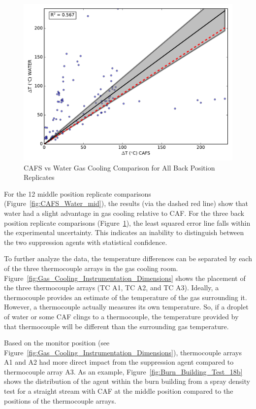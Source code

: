 \documentclass[12pt,oneside]{book}
\begin{document}
\begin{figure}[!ht]
	\includegraphics[width=.7\columnwidth]{../Figures/Gas_Cooling/Combined_fullback_scatter}
	\caption{CAFS vs Water Gas Cooling Comparison for All Back Position Replicates}
	\label{fig:CAFS_Water_full}
\end{figure}

For the 12 middle position replicate comparisons (Figure~\ref{fig:CAFS_Water_mid}), the results (via the dashed red line) show that water had a slight advantage in gas cooling relative to CAF. For the three back position replicate comparisons (Figure~\ref{fig:CAFS_Water_full}), the least squared error line falls within the experimental uncertainty. This indicates an inability to distinguish between the two suppression agents with statistical confidence. 

To further analyze the data, the temperature differences can be separated by each of the three thermocouple arrays in the gas cooling room. Figure~\ref{fig:Gas_Cooling_Instrumentation_Dimensions} shows the placement of the three thermocouple arrays (TC A1, TC A2, and TC A3). Ideally, a thermocouple provides an estimate of the temperature of the gas surrounding it. However, a thermocouple actually measures its own temperature. So, if a droplet of water or some CAF clings to a thermocouple, the temperature provided by that thermocouple will be different than the surrounding gas temperature.

Based on the monitor position (see Figure~\ref{fig:Gas_Cooling_Instrumentation_Dimensions}), thermocouple arrays A1 and A2 had more direct impact from the suppression agent compared to thermocouple array A3. As an example, Figure~\ref{fig:Burn_Building_Test_18b} shows the distribution of the agent within the burn building from a spray density test for a straight stream with CAF at the middle position compared to the positions of the thermocouple arrays.
\end{document}
